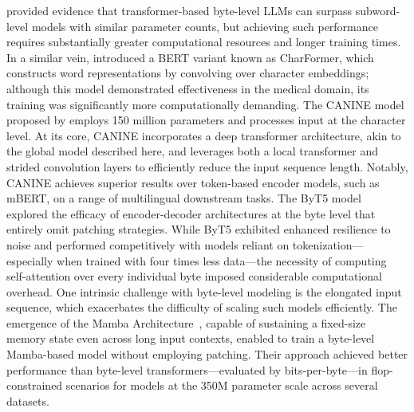 \cite{Choe2019BridgingTG} provided evidence that transformer-based byte-level LLMs can surpass subword-level models with similar parameter counts, but achieving such performance requires substantially greater computational resources and longer training times. In a similar vein, \cite{el2020characterbert} introduced a BERT variant known as CharFormer, which constructs word representations by convolving over character embeddings; although this model demonstrated effectiveness in the medical domain, its training was significantly more computationally demanding. The CANINE model proposed by \cite{clark2022canine} employs 150 million parameters and processes input at the character level. At its core, CANINE incorporates a deep transformer architecture, akin to the global model described here, and leverages both a local transformer and strided convolution layers to efficiently reduce the input sequence length. Notably, CANINE achieves superior results over token-based encoder models, such as mBERT, on a range of multilingual downstream tasks. The ByT5 model~\citep{xue2022byt5} explored the efficacy of encoder-decoder architectures at the byte level that entirely omit patching strategies. While ByT5 exhibited enhanced resilience to noise and performed competitively with models reliant on tokenization—especially when trained with four times less data—the necessity of computing self-attention over every individual byte imposed considerable computational overhead. One intrinsic challenge with byte-level modeling is the elongated input sequence, which exacerbates the difficulty of scaling such models efficiently. The emergence of the Mamba Architecture~\citep{gu2023mamba}, capable of sustaining a fixed-size memory state even across long input contexts, enabled \cite{wang2024mambabyte} to train a byte-level Mamba-based model without employing patching. Their approach achieved better performance than byte-level transformers—evaluated by bits-per-byte—in flop-constrained scenarios for models at the 350M parameter scale across several datasets.

